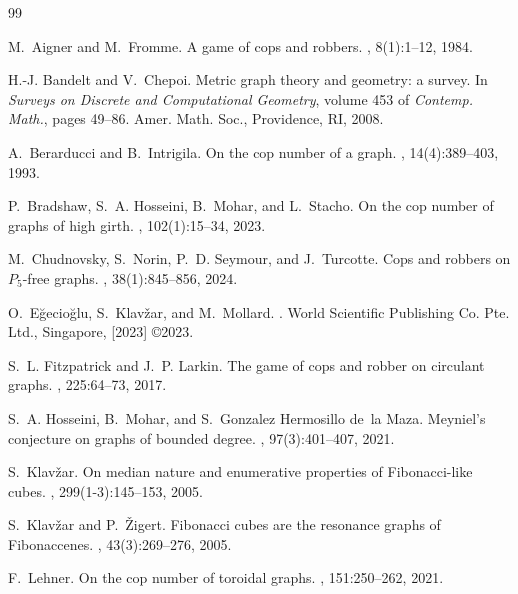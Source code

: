 \documentclass[11pt]{article}
\begin{document}
\begin{thebibliography}{99}
	
	M.~Aigner and M.~Fromme.
	\newblock A game of cops and robbers.
	, 8(1):1--12, 1984.
	
	H.-J. Bandelt and V.~Chepoi.
	\newblock Metric graph theory and geometry: a survey.
	\newblock In {\em Surveys on Discrete and Computational Geometry}, volume 453
	of {\em Contemp. Math.}, pages 49--86. Amer. Math. Soc., Providence, RI,
	2008.
	
	A.~Berarducci and B.~Intrigila.
	\newblock On the cop number of a graph.
	, 14(4):389--403, 1993.
	
	P.~Bradshaw, S.~A. Hosseini, B.~Mohar, and L.~Stacho.
	\newblock On the cop number of graphs of high girth.
	, 102(1):15--34, 2023.
	
	M.~Chudnovsky, S.~Norin, P.~D. Seymour, and J.~Turcotte.
	\newblock Cops and robbers on {$P_5$}-free graphs.
	, 38(1):845--856, 2024.
	
	O.~E\u{g}ecio\u{g}lu, S.~Klav\v{z}ar, and M.~Mollard.
	.
	\newblock World Scientific Publishing Co. Pte. Ltd., Singapore, [2023]
	\copyright 2023.
	
	S.~L. Fitzpatrick and J.~P. Larkin.
	\newblock The game of cops and robber on circulant graphs.
	, 225:64--73, 2017.
	
	S.~A. Hosseini, B.~Mohar, and S.~Gonzalez Hermosillo de~la Maza.
	\newblock Meyniel's conjecture on graphs of bounded degree.
	, 97(3):401--407, 2021.
	
	S.~Klav\v{z}ar.
	\newblock On median nature and enumerative properties of {F}ibonacci-like
	cubes.
	, 299(1-3):145--153, 2005.
	
	S.~Klav\v{z}ar and P.~\v{Z}igert.
	\newblock Fibonacci cubes are the resonance graphs of {F}ibonaccenes.
	, 43(3):269--276, 2005.
	
	F.~Lehner.
	\newblock On the cop number of toroidal graphs.
	, 151:250--262, 2021.
	

\end{thebibliography}
\end{document}
